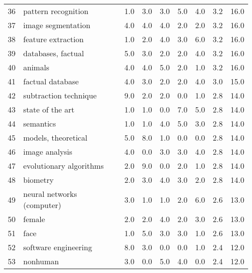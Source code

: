 \begin{tabular}{llrrrrrrr}
36 &                      pattern recognition &   1.0 &   3.0 &   3.0 &   5.0 &   4.0 &   3.2 &   16.0 \\
37 &                       image segmentation &   4.0 &   4.0 &   4.0 &   2.0 &   2.0 &   3.2 &   16.0 \\
38 &                       feature extraction &   1.0 &   2.0 &   4.0 &   3.0 &   6.0 &   3.2 &   16.0 \\
39 &                       databases, factual &   5.0 &   3.0 &   2.0 &   2.0 &   4.0 &   3.2 &   16.0 \\
40 &                                  animals &   4.0 &   4.0 &   5.0 &   2.0 &   1.0 &   3.2 &   16.0 \\
41 &                         factual database &   4.0 &   3.0 &   2.0 &   2.0 &   4.0 &   3.0 &   15.0 \\
42 &                    subtraction technique &   9.0 &   2.0 &   2.0 &   0.0 &   1.0 &   2.8 &   14.0 \\
43 &                         state of the art &   1.0 &   1.0 &   0.0 &   7.0 &   5.0 &   2.8 &   14.0 \\
44 &                                semantics &   1.0 &   1.0 &   4.0 &   5.0 &   3.0 &   2.8 &   14.0 \\
45 &                      models, theoretical &   5.0 &   8.0 &   1.0 &   0.0 &   0.0 &   2.8 &   14.0 \\
46 &                           image analysis &   4.0 &   0.0 &   3.0 &   3.0 &   4.0 &   2.8 &   14.0 \\
47 &                  evolutionary algorithms &   2.0 &   9.0 &   0.0 &   2.0 &   1.0 &   2.8 &   14.0 \\
48 &                                 biometry &   2.0 &   3.0 &   4.0 &   3.0 &   2.0 &   2.8 &   14.0 \\
49 &               neural networks (computer) &   3.0 &   1.0 &   1.0 &   2.0 &   6.0 &   2.6 &   13.0 \\
50 &                                   female &   2.0 &   2.0 &   4.0 &   2.0 &   3.0 &   2.6 &   13.0 \\
51 &                                     face &   1.0 &   5.0 &   3.0 &   3.0 &   1.0 &   2.6 &   13.0 \\
52 &                     software engineering &   8.0 &   3.0 &   0.0 &   0.0 &   1.0 &   2.4 &   12.0 \\
53 &                                 nonhuman &   3.0 &   0.0 &   5.0 &   4.0 &   0.0 &   2.4 &   12.0 \\

\end{tabular}
